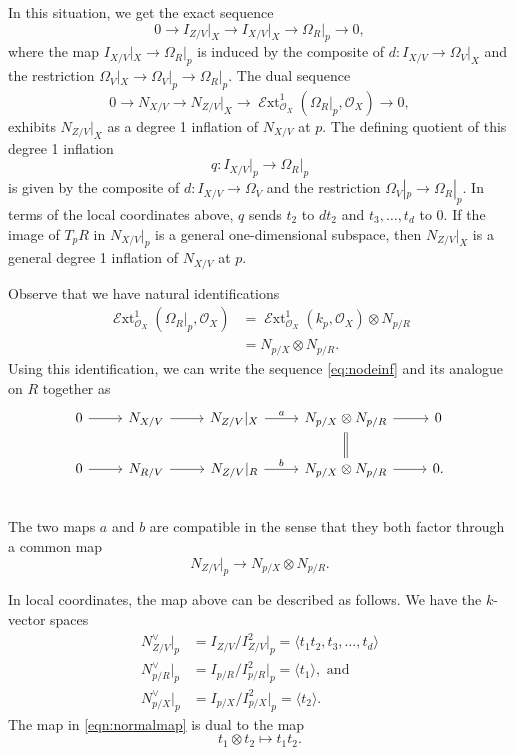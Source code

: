 \documentclass[11 pt]{amsart}
\renewcommand{\k}{k}
\renewcommand{\O}{{\mathcal O}}
\DeclareMathOperator{\shExt}{\mathscr{E}xt}
\providecommand {\from}{{\colon}}
\numberwithin{equation}{section}
\begin{document}
In this situation, we get the exact sequence
\[ 0 \to I_{Z/V} \big|_X \to I_{X/V}\big|_X \to \Omega_R \big|_p \to 0,\]
where the map $I_{X/V}|_X \to \Omega_R|_p$ is induced by the composite of $d \from I_{X/V} \to \Omega_V|_X$ and the restriction $\Omega_V|_X \to \Omega_V|_p \to \Omega_R|_p$.
The dual sequence
\begin{equation}\label{eq:nodeinf}
  0 \to N_{X/V} \to N_{Z/V}\big|_X \to \shExt^1_{\O_X}\left(\Omega_R\big|_p, \O_X\right) \to 0,
\end{equation}
exhibits $N_{Z/V}|_X$ as a degree 1 inflation of $N_{X/V}$ at $p$.
The defining quotient of this degree 1 inflation
\begin{equation}\label{eq:nodaldefiningquotient}
  q \from I_{X/V}\big|_p \to \Omega_{R}\big|_p 
\end{equation}
is given by the composite of $d \from I_{X/V} \to \Omega_V$ and the restriction $\Omega_V|_p \to \Omega_R|_p$.
In terms of the local coordinates above, $q$ sends $t_2$  to $dt_2$ and $t_3, \dots, t_d$ to $0$.
If the image of $T_p R$ in $N_{X/V}|_p$ is a general one-dimensional subspace, then $N_{Z/V}|_X$ is a general degree 1 inflation of $N_{X/V}$ at $p$.

Observe that we have natural identifications
\begin{align*}
  \shExt_{\O_X}^1\left(\Omega_R\big|_p, \O_X\right) &= \shExt_{\O_X}^1\left(\k_p, \O_X\right) \otimes N_{p/R} \\
  &= N_{p/X} \otimes N_{p/R}.
\end{align*}
Using this identification, we can write the sequence \eqref{eq:nodeinf} and its analogue on $R$ together as 
\begin{equation}
  \label{eq:inftogether}
  \begin{tikzcd}
    0 \arrow{r}& N_{X/V} \arrow{r}& N_{Z/V}|_X \arrow{r}{a}& N_{p/X} \otimes N_{p/R} \arrow{r}& 0\\
        0 \arrow{r}& N_{R/V} \arrow{r}& N_{Z/V}|_R \arrow{r}{b}& N_{p/X} \otimes N_{p/R} \arrow{r}\arrow[equal]{u}& 0.\\
  \end{tikzcd}
\end{equation}
The two maps $a$ and $b$ are compatible in the sense that they both factor through a common map
\begin{equation}\label{eqn:normalmap}
  N_{Z/V}|_p \to N_{p/X} \otimes N_{p/R}.
\end{equation}

In local coordinates, the map above can be described as follows.
We have the $k$-vector spaces
\begin{align*}
  N^\vee_{Z/V}|_p &= I_{Z/V}/I_{Z/V}^2|_p = \langle  t_1t_2, t_3, \dots, t_d \rangle\\
  N^\vee_{p/R}|_p &= I_{p/R}/I_{p/R}^2|_p = \langle  t_1 \rangle, \text{ and }\\
  N^\vee_{p/X}|_p &= I_{p/X}/I_{p/X}^2|_p = \langle  t_2 \rangle.
\end{align*}
The map in \eqref{eqn:normalmap} is dual to the map
\[ t_1 \otimes t_2 \mapsto t_1t_2. \]
\end{document}

